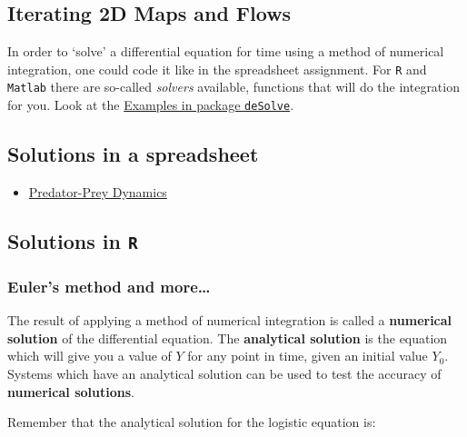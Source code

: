 \documentclass[]{book}
\providecommand{\tightlist}{%
  \setlength{\itemsep}{0pt}\setlength{\parskip}{0pt}}
\begin{document}
\subsection*{Iterating 2D Maps and
Flows}\label{iterating-2d-maps-and-flows-1}

In order to `solve' a differential equation for time using a method of
numerical integration, one could code it like in the spreadsheet
assignment. For \texttt{R} and \texttt{Matlab} there are so-called
\emph{solvers} available, functions that will do the integration for
you. Look at the
\href{http://www.inside-r.org/packages/cran/deSolve/docs/euler}{Examples
in package \texttt{deSolve}}.

\subsection*{Solutions in a
spreadsheet}\label{solutions-in-a-spreadsheet-2}

\begin{itemize}
\tightlist
\item
  \href{https://docs.google.com/spreadsheets/d/1rZDEo8XYNCzhRWrWOli7DDB6f4m87p-hjYv2_KlBLa4/edit?usp=sharing}{Predator-Prey
  Dynamics}
\end{itemize}

\subsection{\texorpdfstring{Solutions in
\texttt{R}}{Solutions in R}}\label{solutions-in-r-2}

\subsubsection*{Euler's method and
more\ldots{}}\label{eulers-method-and-more}

The result of applying a method of numerical integration is called a
\textbf{numerical solution} of the differential equation. The
\textbf{analytical solution} is the equation which will give you a value
of \(Y\) for any point in time, given an initial value \(Y_0\). Systems
which have an analytical solution can be used to test the accuracy of
\textbf{numerical solutions}.

Remember that the analytical solution for the logistic equation is:
\end{document}
